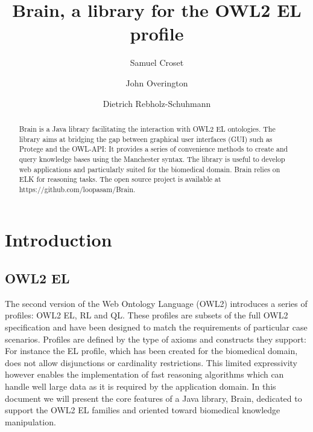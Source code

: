 \documentclass{llncs}
\begin{document}
%
\frontmatter          %
%
\pagestyle{headings}  %

\mainmatter              %
%
\title{Brain, a library for the OWL2 EL profile}
%
%
\author{Samuel Croset \and John Overington \and Dietrich Rebholz-Schuhmann}

\maketitle              %

\begin{abstract}
Brain is a Java library facilitating the interaction with OWL2 EL ontologies. 
The library aims at bridging the gap between graphical user interfaces (GUI) such as Protege and the OWL-API: It provides 
a series of convenience methods to create and query knowledge bases using the Manchester syntax. 
The library is useful to develop web applications and particularly suited for the biomedical domain. 
Brain relies on ELK for reasoning tasks. The open source project is available at https://github.com/loopasam/Brain.

\end{abstract}

\section{Introduction}
\subsection{OWL2 EL}
The second version of the Web Ontology Language (OWL2) introduces a series of profiles: OWL2 EL, RL and QL.
These profiles are subsets of the full OWL2 specification and have been designed to match the requirements of particular case scenarios.
Profiles are defined by the type of axioms and constructs they support: For instance the EL profile, which has been 
created for the biomedical domain, does not allow 
disjunctions or cardinality restrictions. This limited expressivity however enables the implementation of fast reasoning algorithms which can
handle well large data as it is required by the application domain. In this document we will present the core features of a 
Java library, Brain, dedicated to support the OWL2 EL families and oriented toward biomedical knowledge manipulation.
\end{document}
